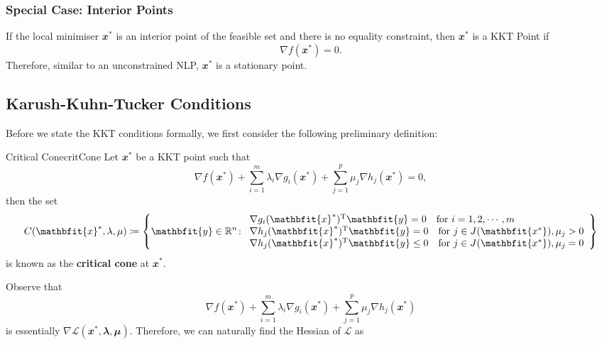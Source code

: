 \documentclass[math, code]{amznotes}
\theoremstyle{remark}
\begin{document}
\subsubsection{Special Case: Interior Points}
If the local minimiser $\mathbfit{x}^*$ is an interior point of the feasible set and there is no equality constraint, then $\mathbfit{x}^*$ is a KKT Point if 
\begin{equation*}
    \nabla f(\mathbfit{x}^*) = 0.
\end{equation*}
Therefore, similar to an unconstrained NLP, $\mathbfit{x}^*$ is a stationary point.

\subsection{Karush-Kuhn-Tucker Conditions}
Before we state the KKT conditions formally, we first consider the following preliminary definition:
\begin{dfnbox}{Critical Cone}{critCone}
    Let $\mathbfit{x}^*$ be a KKT point such that
    \begin{equation*}
        \nabla f(\mathbfit{x}^*) + \sum_{i = 1}^{m}\lambda_i\nabla g_i(\mathbfit{x}^*) + \sum_{j = 1}^{p}\mu_j\nabla h_j(\mathbfit{x}^*) = \mathbfit{0},
    \end{equation*}
    then the set
    \begin{equation*}
        C(\mathbfit{x}^*, \lambda, \mu) \coloneqq \left\{\mathbfit{y} \in \R^n \colon \begin{array}{l}
            \nabla g_i(\mathbfit{x}^*)^{\mathrm{T}}\mathbfit{y} = 0 \quad\textrm{for } i = 1, 2, \cdots, m \\
            \nabla h_j(\mathbfit{x}^*)^{\mathrm{T}}\mathbfit{y} = 0 \quad\textrm{for } j \in J(\mathbfit{x^*}), \mu_j > 0 \\
            \nabla h_j(\mathbfit{x}^*)^{\mathrm{T}}\mathbfit{y} \leq 0 \quad\textrm{for } j \in J(\mathbfit{x^*}), \mu_j = 0
        \end{array}\right\}
    \end{equation*}
    is known as the {\color{red} \textbf{critical cone}} at $\mathbfit{x}^*$.
\end{dfnbox}
Observe that
\begin{equation*}
    \nabla f(\mathbfit{x}^*) + \sum_{i = 1}^{m}\lambda_i\nabla g_i(\mathbfit{x}^*) + \sum_{j = 1}^{p}\mu_j\nabla h_j(\mathbfit{x}^*)
\end{equation*}
is essentially $\nabla \mathcal{L}(\mathbfit{x}^*, \mathbfit{\lambda}, \mathbfit{\mu})$. Therefore, we can naturally find the Hessian of $\mathcal{L}$ as
\end{document}
